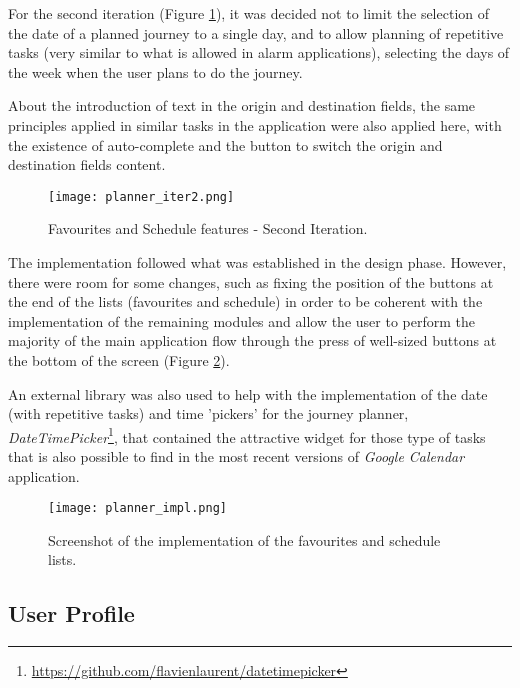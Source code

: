 For the second iteration (Figure \ref{fig:planner_iter2}), it was decided not to limit the selection of the date of a planned journey to a single day, and to allow planning of repetitive tasks (very similar to what is allowed in alarm applications), selecting the days of the week when the user plans to do the journey.

About the introduction of text in the origin and destination fields, the same principles applied in similar tasks in the application were also applied here, with the existence of auto-complete and the button to switch the origin and destination fields content.

\begin{figure}[h!]
  \begin{center}
    \leavevmode
    \texttt{[image: planner\_iter2.png]}
    \caption{Favourites and Schedule features - Second Iteration.}
    \label{fig:planner_iter2}
  \end{center}
\end{figure}

\newpage

The implementation followed what was established in the design phase. However, there were room for some changes, such as fixing the position of the buttons at the end of the lists (favourites and schedule) in order to be coherent with the implementation of the remaining modules and allow the user to perform the majority of the main application flow through the press of well-sized buttons at the bottom of the screen (Figure \ref{fig:planner_impl}).

An external library was also used to help with the implementation of the date (with repetitive tasks) and time 'pickers' for the journey planner, \emph{DateTimePicker}\footnote{\url{https://github.com/flavienlaurent/datetimepicker}}, that contained the attractive widget for those type of tasks that is also possible to find in the most recent versions of \emph{Google Calendar} application.

\begin{figure}[h!]
  \begin{center}
    \leavevmode
    \texttt{[image: planner\_impl.png]}
    \caption{Screenshot of the implementation of the favourites and schedule lists.}
    \label{fig:planner_impl}
  \end{center}
\end{figure}

\subsection{User Profile}\label{userprofileimpl}

